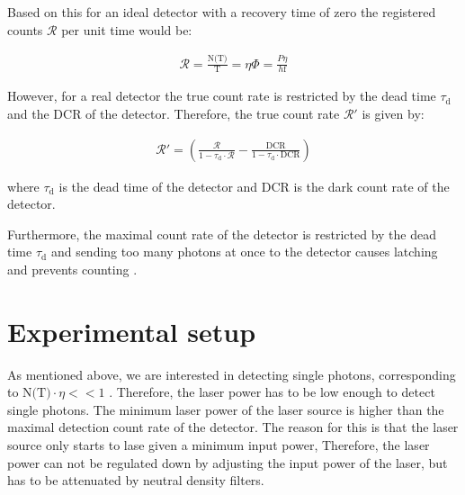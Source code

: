 Based on this for an ideal detector with a recovery time of zero the registered counts $\mathcal{R}$ per unit time would be:

\begin{align}
    \mathcal{R} = \frac{\text{N(T)}}{\text{T}} = \eta \Phi= \frac{P \eta}{h \text{f}}
\end{align}

However, for a real detector the true count rate is restricted by the dead time $\tau_{\text{d}}$ and
the DCR of the detector.
Therefore, the true count rate $\mathcal{R}'$ is given by:

\begin{align}
    \mathcal{R}' = \left(\frac{\mathcal{R}}{1 - \tau_{\text{d}} \cdot \mathcal{R}}
    - \frac{\text{DCR}}{1 - \tau_{\text{d}} \cdot \text{DCR}}\right)
\end{align}

where $\tau_{\text{d}}$ is the dead time of the detector and DCR is the dark count rate of the detector.

Furthermore, the maximal count rate of the detector is restricted by the dead time $\tau_{\text{d}}$ and
sending too many photons at once to the detector causes latching and prevents counting \cite{single-quantum-2022}.

\section{Experimental setup}\label{sec:experimental_setup}
As mentioned above, we are interested in detecting single photons, corresponding to $\text{N(T)} \cdot \eta << 1$ \cite{hadfield-2009}.
Therefore, the laser power has to be low enough to detect single photons.
The minimum laser power of the laser source is higher than the maximal detection count rate of the detector.
The reason for this is that the laser source only starts to lase given a minimum input power,
Therefore, the laser power can not be regulated down by adjusting the input power of the laser, but has to be attenuated
by neutral density filters.\\

